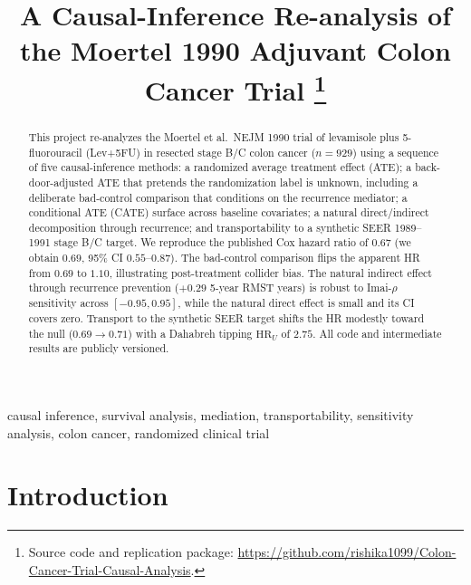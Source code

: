 \documentclass[conference]{IEEEtran}
\begin{document}
\title{A Causal-Inference Re-analysis of the Moertel 1990 Adjuvant Colon Cancer Trial%
\thanks{Source code and replication package: \url{https://github.com/rishika1099/Colon-Cancer-Trial-Causal-Analysis}.}}

\author{
}

\maketitle

\begin{abstract}
This project re-analyzes the Moertel et al.\ NEJM 1990 trial of levamisole plus 5-fluorouracil (Lev+5FU) in resected stage B/C colon cancer ($n{=}929$) using a sequence of five causal-inference methods: a randomized average treatment effect (ATE); a back-door-adjusted ATE that pretends the randomization label is unknown, including a deliberate bad-control comparison that conditions on the recurrence mediator; a conditional ATE (CATE) surface across baseline covariates; a natural direct/indirect decomposition through recurrence; and transportability to a synthetic SEER 1989--1991 stage B/C target. We reproduce the published Cox hazard ratio of $0.67$ (we obtain $0.69$, 95\% CI $0.55$--$0.87$). The bad-control comparison flips the apparent HR from $0.69$ to $1.10$, illustrating post-treatment collider bias. The natural indirect effect through recurrence prevention ($+0.29$ 5-year RMST years) is robust to Imai-$\rho$ sensitivity across $[-0.95, 0.95]$, while the natural direct effect is small and its CI covers zero. Transport to the synthetic SEER target shifts the HR modestly toward the null ($0.69 \to 0.71$) with a Dahabreh tipping $\mathrm{HR}_U$ of $2.75$. All code and intermediate results are publicly versioned.
\end{abstract}

\begin{IEEEkeywords}
causal inference, survival analysis, mediation, transportability, sensitivity analysis, colon cancer, randomized clinical trial
\end{IEEEkeywords}

\section{Introduction}
\end{document}
